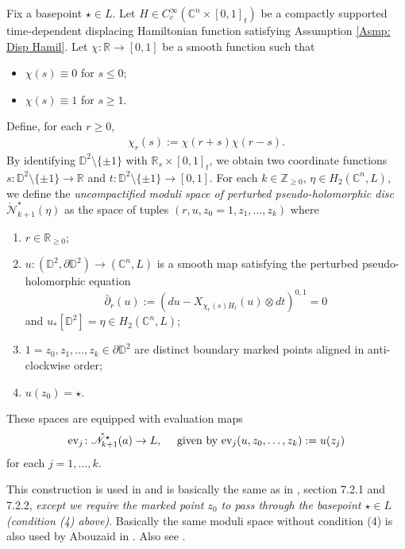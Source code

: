 \documentclass[10pt]{amsart}
\numberwithin{equation}{section}
\theoremstyle{plain}
\theoremstyle{definition}
\theoremstyle{remark}
\numberwithin{equation}{section}
\newcommand{\R}{\mathbb{R}}
\newcommand{\Z}{\mathbb{Z}}
\newcommand{\C}{\mathbb{C}}
\newcommand{\D}{\mathbb{D}}
\newcommand{\ev}{\textup{ev}}
\newcommand{\ms}[1]{\mathscr{#1}}
\begin{document}
{Fix a basepoint $\star\in L$.
Let $H\in C_c^\infty(\C^n\times [0,1]_t)$ be a compactly supported time-dependent displacing Hamiltonian function satisfying Assumption \ref{Asmp: Disp Hamil}. 
Let $\chi\colon\R\to [0,1]$ be a smooth function such that 
\begin{itemize}
	\item $\chi(s) \equiv 0$ for $s\leq 0$;
	\item $\chi(s) \equiv 1$ for $s\geq 1$.
\end{itemize}
Define, for each $r\geq 0$,
\begin{align*}
	\chi_r(s):= \chi(r+s)\chi(r-s).
\end{align*}
By identifying $\D^2\setminus\{\pm 1\}$ with $\R_s\times [0,1]_t$, we obtain two coordinate functions $s\colon \D^2\setminus\{\pm 1\}\to \R$ and $t\colon \D^2\setminus\{\pm 1\}\to [0,1].$
For each $k\in \Z_{\geq 0}$, $\eta\in H_2(\C^n,L)$, we define the \emph{uncompactified moduli space of perturbed pseudo-holomorphic disc} $\mathring{\ms{N}}^\star_{k+1}(\eta)$ as the space of tuples $(r, u,z_0=1, z_1, \dots, z_k)$ where 
\begin{enumerate}
	\item $r\in \R_{\geq 0}$;
	\item $u\colon (\D^2, \partial \D^2)\to (\C^n,L)$ is a smooth map satisfying the perturbed pseudo-holomorphic equation \[ \bar\partial_r (u):= \left(du - X_{\chi_r(s)H_t}(u)\otimes dt\right)^{0,1} = 0 \] and $u_*[\D^2] = \eta\in H_2(\C^n,L)$;
	\item $1=z_0, z_1,\dots, z_k\in \partial \D^2$ are distinct boundary marked points aligned in anti-clockwise order;
	\item $u(z_0)=\star$.
\end{enumerate}


These spaces are equipped with evaluation maps
\begin{align*}
	\ev_j\colon \mathring{\ms{N}}^\star_{k+1}(a)\to L,\quad \textup{ given by } \ev_j(u,z_0,\dots, z_k):= u(z_j)
\end{align*}
for each $j=1,\dots, k$.


This construction is used in \cite{FukayaLagrangian} and is basically the same as in \cite{Irie2}, section 7.2.1 and 7.2.2, \emph{except  we require the marked point $z_0$ to pass through the basepoint $\star\in L$ (condition (4) above)}. Basically the same moduli space without condition (4) is also used by Abouzaid in \cite{AbouzaidFramedBordism}.
Also see \cite{BiranCieliebak, PolterovichMonotone}.

}
\end{document}
